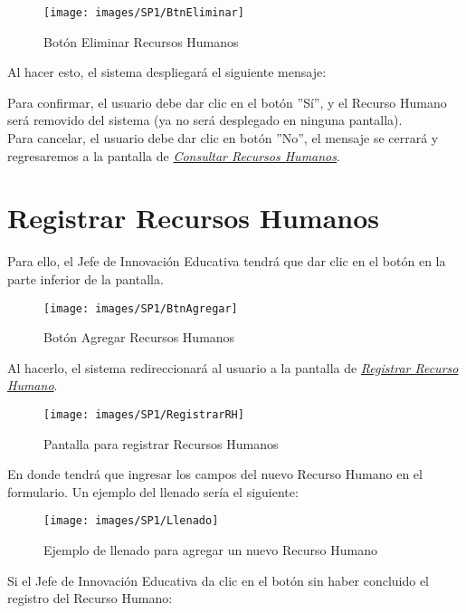             \begin{figure}[!hbtp]
                \centering
                \hypertarget{eliminar}{\texttt{[image: images/SP1/BtnEliminar]}}
                \caption{Botón Eliminar Recursos Humanos}
                \label{eliminar}
            \end{figure}

            Al hacer esto, el sistema despliegará el siguiente mensaje:

            Para confirmar, el usuario debe dar clic en el botón ''Sí'', y el Recurso Humano será removido del sistema (ya no será desplegado en ninguna pantalla).\\

            Para cancelar, el usuario debe dar clic en botón ''No'', el mensaje se cerrará y regresaremos a la pantalla de \hyperlink{consultarrh}{\textit{Consultar Recursos Humanos}}.\\

    	\section{Registrar Recursos Humanos}

        	Para ello, el Jefe de Innovación Educativa tendrá que dar clic en el botón \IUbutton{+} en la parte inferior de la pantalla.

        	\begin{figure}[!hbtp]
        		\centering
        		\hypertarget{add}{\texttt{[image: images/SP1/BtnAgregar]}}
        		\caption{Botón Agregar Recursos Humanos}
        		\label{add}
        	\end{figure}

        	Al hacerlo, el sistema redireccionará al usuario a la pantalla de \hyperlink{registrarrh}{\textit{Registrar Recurso Humano}}.

        \begin{figure}[!hbtp]
            \centering
            \hypertarget{registrarrh}{\texttt{[image: images/SP1/RegistrarRH]}}
            \caption{Pantalla para registrar Recursos Humanos}
            \label{registrarrh}
        \end{figure}

        En donde tendrá que ingresar los campos del nuevo Recurso Humano en el formulario. Un ejemplo del llenado sería el siguiente:

        \begin{figure}[!hbtp]
            \centering
            \hypertarget{ejreg}{\texttt{[image: images/SP1/Llenado]}}
            \caption{Ejemplo de llenado para agregar un nuevo Recurso Humano}
            \label{ejreg}
        \end{figure}
        \newpage
        Si el Jefe de Innovación Educativa da clic en el botón  sin haber concluido el registro del Recurso Humano:

